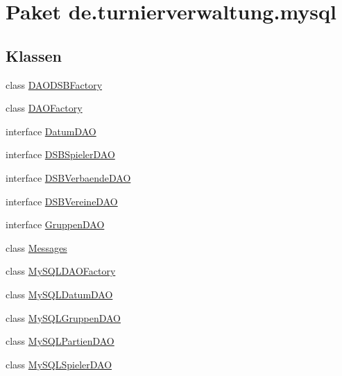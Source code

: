 \hypertarget{namespacede_1_1turnierverwaltung_1_1mysql}{}\section{Paket de.\+turnierverwaltung.\+mysql}
\label{namespacede_1_1turnierverwaltung_1_1mysql}
\subsection*{Klassen}
\begin{DoxyCompactItemize}
\item 
class \hyperlink{classde_1_1turnierverwaltung_1_1mysql_1_1_d_a_o_d_s_b_factory}{D\+A\+O\+D\+S\+B\+Factory}
\item 
class \hyperlink{classde_1_1turnierverwaltung_1_1mysql_1_1_d_a_o_factory}{D\+A\+O\+Factory}
\item 
interface \hyperlink{interfacede_1_1turnierverwaltung_1_1mysql_1_1_datum_d_a_o}{Datum\+D\+AO}
\item 
interface \hyperlink{interfacede_1_1turnierverwaltung_1_1mysql_1_1_d_s_b_spieler_d_a_o}{D\+S\+B\+Spieler\+D\+AO}
\item 
interface \hyperlink{interfacede_1_1turnierverwaltung_1_1mysql_1_1_d_s_b_verbaende_d_a_o}{D\+S\+B\+Verbaende\+D\+AO}
\item 
interface \hyperlink{interfacede_1_1turnierverwaltung_1_1mysql_1_1_d_s_b_vereine_d_a_o}{D\+S\+B\+Vereine\+D\+AO}
\item 
interface \hyperlink{interfacede_1_1turnierverwaltung_1_1mysql_1_1_gruppen_d_a_o}{Gruppen\+D\+AO}
\item 
class \hyperlink{classde_1_1turnierverwaltung_1_1mysql_1_1_messages}{Messages}
\item 
class \hyperlink{classde_1_1turnierverwaltung_1_1mysql_1_1_my_s_q_l_d_a_o_factory}{My\+S\+Q\+L\+D\+A\+O\+Factory}
\item 
class \hyperlink{classde_1_1turnierverwaltung_1_1mysql_1_1_my_s_q_l_datum_d_a_o}{My\+S\+Q\+L\+Datum\+D\+AO}
\item 
class \hyperlink{classde_1_1turnierverwaltung_1_1mysql_1_1_my_s_q_l_gruppen_d_a_o}{My\+S\+Q\+L\+Gruppen\+D\+AO}
\item 
class \hyperlink{classde_1_1turnierverwaltung_1_1mysql_1_1_my_s_q_l_partien_d_a_o}{My\+S\+Q\+L\+Partien\+D\+AO}
\item 
class \hyperlink{classde_1_1turnierverwaltung_1_1mysql_1_1_my_s_q_l_spieler_d_a_o}{My\+S\+Q\+L\+Spieler\+D\+AO}

\end{DoxyCompactItemize}
